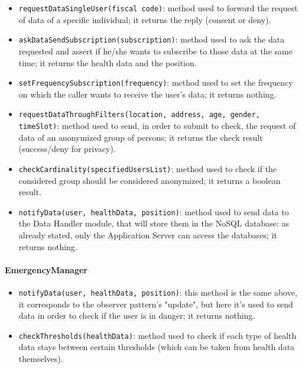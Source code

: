 \begin{itemize}
\item[ ]\texttt{requestDataSingleUser(fiscal code)}: method used to forward the request of data of a specific individual; it returns the reply (consent or deny).

\item[ ]\texttt{askDataSendSubscription(subscription)}: method used to ask the data requested and assert if he/she wants to subscribe to those data at the same time; it returns the health data and the position.

\item[ ]\texttt{setFrequencySubscription(frequency)}: method used to set the frequency on which the caller wants to receive the user's data; it returns nothing.

\item[ ]\texttt{requestDataThroughFilters(location, address, age, gender, timeSlot)}: method us\-ed to send, in order to submit to check, the request of data of an anonymized group of persons; it returns the check result (success/deny for privacy).

\item[ ]\texttt{checkCardinality(specifiedUsersList)}: method used to check if the considered group should be considered anonymized; it returns a boolean result.

\item[ ]\texttt{notifyData(user, healthData, position)}: method used to send data to the Data Handler module, that will store them in the NoSQL database: as already stated, only the Application Server can access the databases; it returns nothing.
\end{itemize}

\paragraph*{EmergencyManager}

\begin{itemize}
\item[ ]\texttt{notifyData(user, healthData, position)}: this method is the same above, it corresponds to the observer pattern's "update", but here it's used to send data in order to check if the user is in danger; it returns nothing.

\item[ ]\texttt{checkThresholds(healthData)}: method used to check if each type of health data stays between certain thresholds (which can be taken from health data themselves).
\end{itemize}

